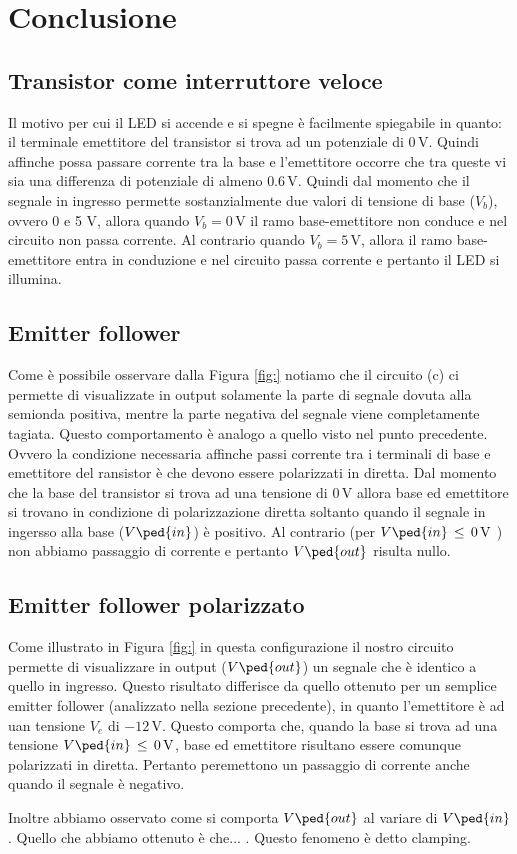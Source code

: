 \section*{Conclusione}

\subsection*{Transistor come interruttore veloce}

Il motivo per cui il LED si accende e si spegne è facilmente spiegabile in quanto: il terminale emettitore del transistor si trova ad un potenziale di $0\,\si{\volt}$. Quindi affinche possa passare corrente tra la base e l'emettitore occorre che tra queste vi sia una differenza di potenziale di almeno $0.6\,\si{\volt}$. Quindi dal momento che il segnale in ingresso permette sostanzialmente due valori di tensione di base ($V_b$), ovvero 0 e 5 $\si{\volt}$, allora quando $V_b=0\,\si{\volt}$ il ramo base-emettitore non conduce e nel circuito non passa corrente. Al contrario quando $V_b=5\,\si{\volt}$, allora il ramo base-emettitore entra in conduzione e nel circuito passa corrente e pertanto il LED si illumina.

\subsection*{Emitter follower}

Come è possibile osservare dalla Figura \ref{fig:} notiamo che il circuito (c) ci permette di visualizzate in output solamente la parte di segnale dovuta alla semionda positiva, mentre la parte negativa del segnale viene completamente tagiata. Questo comportamento è analogo a quello visto nel punto precedente. Ovvero la condizione necessaria affinche passi corrente tra i terminali di base e emettitore del ransistor è che devono essere polarizzati in diretta. Dal momento che la base del transistor si trova ad una tensione di $0\,\si{\volt}$ allora base ed emettitore si trovano in condizione di polarizzazione diretta soltanto quando il segnale in ingersso alla base ($V\ped{in}$) è positivo. Al contrario (per $V\ped{in}\,\leq\,0\,\si{\volt}$ ) non abbiamo passaggio di corrente e pertanto $V\ped{out}$ risulta nullo.

\subsection*{Emitter follower polarizzato}

Come illustrato in Figura \ref{fig:} in questa configurazione il nostro circuito permette di visualizzare in output ($V\ped{out}$) un segnale che è identico a quello in ingresso. Questo risultato differisce da quello ottenuto per un semplice emitter follower (analizzato nella sezione precedente), in quanto l'emettitore è ad uan tensione $V_e$ di $-12\,\si{\volt}$. Questo comporta che, quando la base si trova ad una tensione $V\ped{in}\,\leq\,0\,\si{\volt}$, base ed emettitore risultano essere comunque polarizzati in diretta. Pertanto peremettono un passaggio di corrente anche quando il segnale è negativo.

Inoltre abbiamo osservato come si comporta $V\ped{out}$ al variare di $V\ped{in}$. Quello che abbiamo ottenuto è che... . Questo fenomeno è detto clamping.
